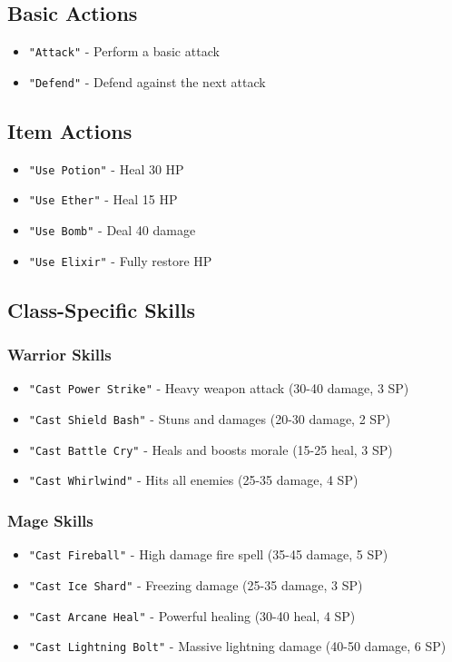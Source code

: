 \documentclass[12pt]{article}
\begin{document}
\subsection{Basic Actions}
\begin{itemize}
    \item \texttt{"Attack"} - Perform a basic attack
    \item \texttt{"Defend"} - Defend against the next attack
\end{itemize}

\subsection{Item Actions}
\begin{itemize}
    \item \texttt{"Use Potion"} - Heal 30 HP
    \item \texttt{"Use Ether"} - Heal 15 HP  
    \item \texttt{"Use Bomb"} - Deal 40 damage
    \item \texttt{"Use Elixir"} - Fully restore HP
\end{itemize}

\subsection{Class-Specific Skills}
\label{subsec:skills}

\subsubsection{Warrior Skills}
\begin{itemize}
    \item \texttt{"Cast Power Strike"} - Heavy weapon attack (30-40 damage, 3 SP)
    \item \texttt{"Cast Shield Bash"} - Stuns and damages (20-30 damage, 2 SP)
    \item \texttt{"Cast Battle Cry"} - Heals and boosts morale (15-25 heal, 3 SP)
    \item \texttt{"Cast Whirlwind"} - Hits all enemies (25-35 damage, 4 SP)
\end{itemize}

\subsubsection{Mage Skills}
\begin{itemize}
    \item \texttt{"Cast Fireball"} - High damage fire spell (35-45 damage, 5 SP)
    \item \texttt{"Cast Ice Shard"} - Freezing damage (25-35 damage, 3 SP)
    \item \texttt{"Cast Arcane Heal"} - Powerful healing (30-40 heal, 4 SP)
    \item \texttt{"Cast Lightning Bolt"} - Massive lightning damage (40-50 damage, 6 SP)
\end{itemize}
\end{document}

